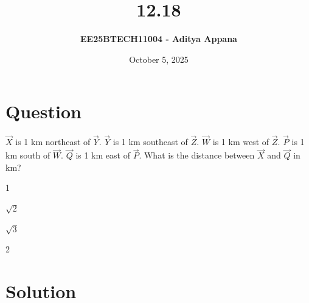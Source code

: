 \documentclass[12pt]{article}
\title{\textbf{12.18}}
\author{\textbf{EE25BTECH11004 - Aditya Appana}}
\date{October 5, 2025}
\begin{document}
\maketitle

\section*{Question}
$\vec{X}$ is 1 km northeast of $\vec{Y}$. $\vec{Y}$ is 1 km southeast of $\vec{Z}$. $\vec{W}$ is 1 km west of $\vec{Z}$. $\vec{P}$ is 1
km south of $\vec{W}$. $\vec{Q}$ is 1 km east of $\vec{P}$. What is the distance between $\vec{X}$ and $\vec{Q}$ in km?
\begin{enumerate}
\begin{multicols}{4}
    \item 1
    \item $\sqrt{2}$
    \item $\sqrt{3}$
    \item 2
\end{multicols}
\end{enumerate}
\section*{Solution}
\end{document}
